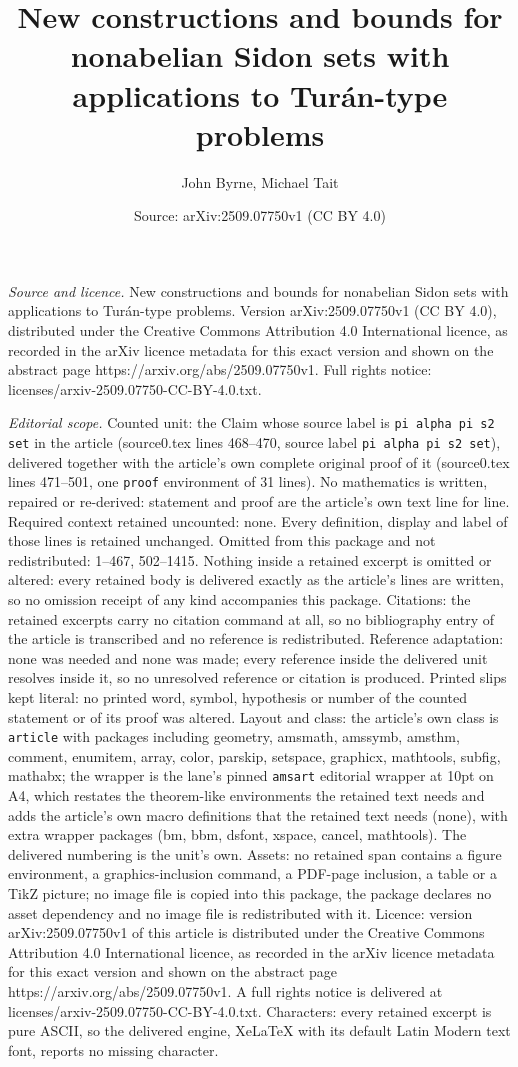 \documentclass[10pt,a4paper]{amsart}
\title[New constructions and bounds for nonabelian Sidon sets with ]{New constructions and bounds for nonabelian Sidon sets with applications to Tur\'an-type problems}
\author{John Byrne, Michael Tait}
\date{Source: arXiv:2509.07750v1 (CC BY 4.0)}
\begin{document}
\maketitle

\noindent\emph{Source and licence.} New constructions and bounds for nonabelian Sidon sets with applications to Tur\'an-type problems. Version arXiv:2509.07750v1 (CC BY 4.0), distributed under the Creative Commons Attribution 4.0 International licence, as recorded in the arXiv licence metadata for this exact version and shown on the abstract page https://arxiv.org/abs/2509.07750v1. Full rights notice: licenses/arxiv-2509.07750-CC-BY-4.0.txt.\par\smallskip

\noindent\textit{Editorial scope.} Counted unit: the Claim whose source label is \texttt{pi alpha pi s2 set} in the article (source0.tex lines 468--470, source label \texttt{pi alpha pi s2 set}), delivered together with the article's own complete original proof of it (source0.tex lines 471--501, one \texttt{proof} environment of 31 lines). No mathematics is written, repaired or re-derived: statement and proof are the article's own text line for line. Required context retained uncounted: none. Every definition, display and label of those lines is retained unchanged. Omitted from this package and not redistributed: 1--467, 502--1415. Nothing inside a retained excerpt is omitted or altered: every retained body is delivered exactly as the article's lines are written, so no omission receipt of any kind accompanies this package. Citations: the retained excerpts carry no citation command at all, so no bibliography entry of the article is transcribed and no reference is redistributed. Reference adaptation: none was needed and none was made; every reference inside the delivered unit resolves inside it, so no unresolved reference or citation is produced. Printed slips kept literal: no printed word, symbol, hypothesis or number of the counted statement or of its proof was altered. Layout and class: the article's own class is \texttt{article} with packages including geometry, amsmath, amssymb, amsthm, comment, enumitem, array, color, parskip, setspace, graphicx, mathtools, subfig, mathabx; the wrapper is the lane's pinned \texttt{amsart} editorial wrapper at 10pt on A4, which restates the theorem-like environments the retained text needs and adds the article's own macro definitions that the retained text needs (none), with extra wrapper packages (bm, bbm, dsfont, xspace, cancel, mathtools). The delivered numbering is the unit's own. Assets: no retained span contains a figure environment, a graphics-inclusion command, a PDF-page inclusion, a table or a TikZ picture; no image file is copied into this package, the package declares no asset dependency and no image file is redistributed with it. Licence: version arXiv:2509.07750v1 of this article is distributed under the Creative Commons Attribution 4.0 International licence, as recorded in the arXiv licence metadata for this exact version and shown on the abstract page https://arxiv.org/abs/2509.07750v1. A full rights notice is delivered at licenses/arxiv-2509.07750-CC-BY-4.0.txt. Characters: every retained excerpt is pure ASCII, so the delivered engine, XeLaTeX with its default Latin Modern text font, reports no missing character.
\end{document}
